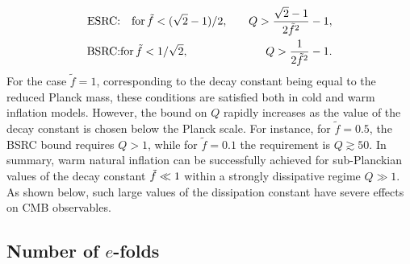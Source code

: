 \begin{eqnarray}
    \text{ESRC:}& \quad \text{for\,} \tilde{f} <(\sqrt{2}-1)/2,\quad &Q>\frac{\sqrt{2}-1}{2\tilde{f}^2}-1, \label{eq:ch5-WI_SRc3} \\
    \text{BSRC:}& \text{for\,} \tilde{f} <1/\sqrt{2}, \quad &Q>\frac{1}{2\tilde{f}^2}-1. \label{eq:ch5-WI_SRc4}
\end{eqnarray}
For the case $\tilde{f}= 1$, corresponding to the decay constant being equal to the reduced Planck mass, these conditions are satisfied both in cold and warm inflation models. However, the bound on $Q$ rapidly increases as the value of the decay constant is chosen below the Planck scale. For instance, for $\tilde{f}=0.5$, the BSRC bound requires $Q>1$, while for $\tilde{f}=0.1$ the requirement is $Q\gtrsim 50$. In summary, warm natural inflation can be successfully achieved for sub-Planckian values of the decay constant $\Tilde{f}\ll 1$ within a strongly dissipative regime $Q \gg 1$. As shown below, such large values of the dissipation constant have severe effects on CMB observables.

\subsection{Number of $e$-folds}

